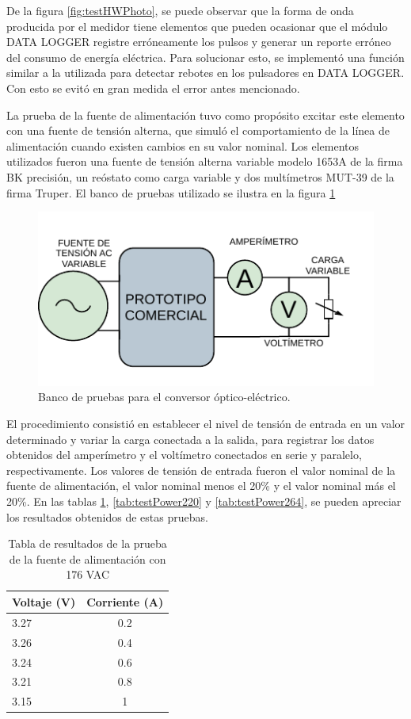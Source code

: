 De la figura \ref{fig:testHWPhoto}, se puede observar que la forma de onda producida por el medidor tiene elementos que pueden ocasionar que el módulo DATA LOGGER registre erróneamente los pulsos y generar un reporte erróneo del consumo de energía eléctrica. Para solucionar esto, se implementó una función similar a la utilizada para detectar rebotes en los pulsadores en DATA LOGGER. Con esto se evitó en gran medida el error antes mencionado.

La prueba de la fuente de alimentación tuvo como propósito excitar este elemento con una fuente de tensión alterna, que simuló el comportamiento de la línea de alimentación cuando existen cambios en su valor nominal. Los elementos utilizados fueron una fuente de tensión alterna variable modelo 1653A de la firma BK precisión, un reóstato como carga variable y dos multímetros MUT-39 de la firma Truper. El banco de pruebas utilizado se ilustra en la figura \ref{fig:testHWBankPower}

\begin{figure}[ht]
	\centering
	\includegraphics[scale=1.1]{./Figures/test_power_bank.pdf}
	\caption{Banco de pruebas para el conversor óptico-eléctrico.}
	\label{fig:testHWBankPower}
\end{figure}

El procedimiento consistió en establecer el nivel de tensión de entrada en un valor determinado y variar la carga conectada a la salida, para registrar los datos obtenidos del amperímetro y el voltímetro conectados en serie y paralelo, respectivamente. Los valores de tensión de entrada fueron el valor nominal de la fuente de alimentación, el valor nominal menos el 20\% y el valor nominal más el 20\%. En las tablas \ref{tab:testPower176}, \ref{tab:testPower220} y \ref{tab:testPower264}, se pueden apreciar los resultados obtenidos de estas pruebas.


\begin{table}[h]
	\centering
	\caption[Prueba de la fuente de alimentación 176 VAC]{Tabla de resultados de la prueba de la fuente de alimentación con 176 VAC}
	\begin{tabular}{l c}    
		\toprule
		\textbf{Voltaje (V)} & \textbf{Corriente (A)} \\
		\midrule
		3.27 & 0.2 \\		
		3.26 & 0.4 \\		
		3.24 & 0.6 \\
		3.21 & 0.8 \\
		3.15 & 1 \\		
		\bottomrule
		\hline
	\end{tabular}
	\label{tab:testPower176}
\end{table}

